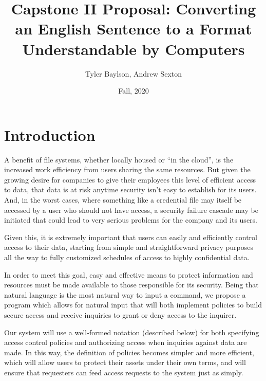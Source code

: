 \documentclass[12pt]{article}
\begin{document}

\title{Capstone II Proposal: Converting an English Sentence to a Format Understandable by Computers}
\author{Tyler Baylson, Andrew Sexton}
\date{Fall, 2020}
\maketitle


\section{Introduction}
A benefit of file systems, whether locally housed or “in the cloud”, is the increased work efficiency from users sharing the same resources. But given the growing desire for companies to give their employees this level of efficient access to data, that data is at risk anytime security isn’t easy to establish for its users. And, in the worst cases, where something like a credential file may itself be accessed by a user who should not have access, a security failure cascade may be initiated that could lead to very serious problems for the company and its users.

Given this, it is extremely important that users can easily and efficiently control access to their data, starting from simple and straightforward privacy purposes all the way to fully customized schedules of access to highly confidential data.

In order to meet this goal, easy and effective means to protect information and resources must be made available to those responsible for its security. 
Being that natural language is the most natural way to input a command, we propose a program which allows for natural input that will both implement policies to build secure access and receive inquiries to grant or deny access to the inquirer.

Our system will use a well-formed notation (described below) for both specifying access control policies and authorizing access when inquiries against data are made. In this way, the definition of policies becomes simpler and more efficient, which will allow users to protect their assets under their own terms, and will ensure that requesters can feed access requests to the system just as simply.
\end{document}
